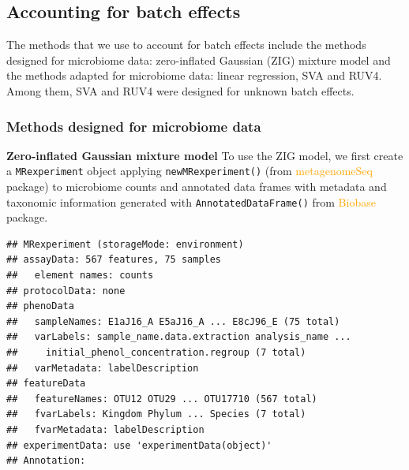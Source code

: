 \documentclass[
]{book}
\newenvironment{Shaded}{\begin{snugshade}}{\end{snugshade}}
\newcommand{\AttributeTok}[1]{\textcolor[rgb]{0.77,0.63,0.00}{#1}}
\newcommand{\CommentTok}[1]{\textcolor[rgb]{0.56,0.35,0.01}{\textit{#1}}}
\newcommand{\FunctionTok}[1]{\textcolor[rgb]{0.00,0.00,0.00}{#1}}
\newcommand{\NormalTok}[1]{#1}
\newcommand{\OtherTok}[1]{\textcolor[rgb]{0.56,0.35,0.01}{#1}}
\newcommand{\SpecialCharTok}[1]{\textcolor[rgb]{0.00,0.00,0.00}{#1}}
\begin{document}
\hypertarget{accnt}{%
\subsection{Accounting for batch effects}\label{accnt}}

The methods that we use to account for batch effects include the methods designed for microbiome data: zero-inflated Gaussian (ZIG) mixture model and the methods adapted for microbiome data: linear regression, SVA and RUV4. Among them, SVA and RUV4 were designed for unknown batch effects.

\hypertarget{methods-designed-for-microbiome-data}{%
\subsubsection{Methods designed for microbiome data}\label{methods-designed-for-microbiome-data}}

\textbf{Zero-inflated Gaussian mixture model} To use the ZIG model, we first create a \texttt{MRexperiment} object applying \texttt{newMRexperiment()} (from \textcolor{orange}{metagenomeSeq} package) to microbiome counts and annotated data frames with metadata and taxonomic information generated with \texttt{AnnotatedDataFrame()} from \textcolor{orange}{Biobase} package.

\begin{Shaded}
\end{Shaded}

\begin{verbatim}
## MRexperiment (storageMode: environment)
## assayData: 567 features, 75 samples 
##   element names: counts 
## protocolData: none
## phenoData
##   sampleNames: E1aJ16_A E5aJ16_A ... E8cJ96_E (75 total)
##   varLabels: sample_name.data.extraction analysis_name ...
##     initial_phenol_concentration.regroup (7 total)
##   varMetadata: labelDescription
## featureData
##   featureNames: OTU12 OTU29 ... OTU17710 (567 total)
##   fvarLabels: Kingdom Phylum ... Species (7 total)
##   fvarMetadata: labelDescription
## experimentData: use 'experimentData(object)'
## Annotation:
\end{verbatim}
\end{document}
